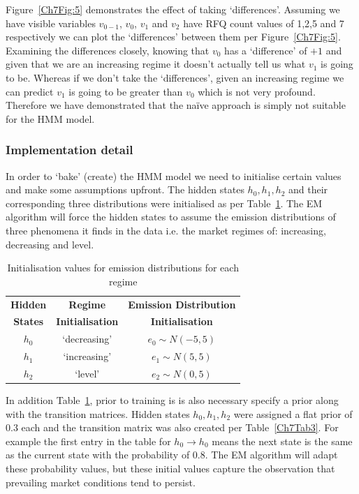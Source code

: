 Figure~\ref{Ch7Fig:5} demonstrates the effect of taking `differences'. Assuming we have visible variables $v_{0-1}$, $v_0$, $v_1$ and $v_2$ have RFQ count values of 1,2,5 and 7 respectively we can plot the `differences' between them per Figure~\ref{Ch7Fig:5}. Examining the differences closely, knowing that $v_0$ has a `difference' of $+1$ and given that we are an increasing regime it doesn't actually tell us what $v_1$ is going to be. Whereas if we don't take the `differences', given an increasing regime we can predict $v_1$ is going to be greater than $v_0$ which is not very profound. Therefore we have demonstrated that the na\"ive approach is simply not suitable for the HMM model.

\subsubsection{Implementation detail}

In order to `bake' (create) the HMM model we need to initialise certain values and make some assumptions upfront. The hidden states $h_0,h_1,h_2$ and their corresponding three distributions were initialised as per Table~\ref{Ch7Tab2}. The EM algorithm will force the hidden states to assume the emission distributions of three phenomena it finds in the data i.e. the market regimes of: increasing, decreasing and level.



\begin{table}[!ht]\centering\small
    \caption{Initialisation values for emission distributions for each regime}\label{Ch7Tab2}
    \begin{tabular}{ccc}
        \toprule
        \bfseries Hidden &
        \bfseries Regime &
        \bfseries Emission Distribution \\
        \bfseries States &
        \bfseries Initialisation &
        \bfseries Initialisation \\
        \midrule
        $h_0$ & `decreasing' & $e_0\sim N (-5,5)$ \\
        $h_1$ & `increasing' & $e_1\sim N ( 5,5)$ \\
        $h_2$ & `level'      & $e_2\sim N ( 0,5)$ \\
        \bottomrule
    \end{tabular}
\end{table}

In addition Table~\ref{Ch7Tab2}, prior to training is is also necessary specify a prior along with the transition matrices. Hidden states $h_0,h_1,h_2$ were assigned a flat prior of 0.3 each and the transition matrix was also created per Table~\ref{Ch7Tab3}. For example the first entry in the table for $h_0 \rightarrow h_0$ means the next state is the same as the current state with the probability of 0.8. The EM algorithm will adapt these probability values, but these initial values capture the observation that prevailing market conditions tend to persist.


